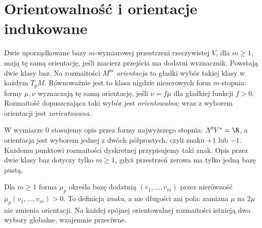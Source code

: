 \section{Orientowalność i orientacje indukowane}
\label{sec:formy-orientacja}

\begin{definicja}[Orientacja]
\label{def:orientacja-formy}
Dwie uporządkowane bazy $m$-wymiarowej przestrzeni
rzeczywistej $V$, dla $m\geq1$, mają tę samą orientację, jeśli
macierz przejścia ma dodatni wyznacznik.
Powstają dwie klasy baz. Na rozmaitości $M^m$
\emph{orientacja} to gładki wybór takiej klasy w
każdym $T_pM$. Równoważnie jest to klasa
nigdzie niezerowych form $m$-stopnia: formy
$\mu,\nu$ wyznaczają tę samą orientację, jeśli
$\nu=f\mu$ dla gładkiej funkcji $f>0$.
Rozmaitość dopuszczająca taki wybór jest
\emph{orientowalna}; wraz z wyborem orientacji
jest \emph{zorientowana}.
\end{definicja}

W wymiarze $0$ stosujemy opis przez formy najwyższego
stopnia: $\Lambda^0 V^*=\R$, a orientacja jest wyborem
jednej z dwóch półprostych, czyli znaku $+1$ lub $-1$.
Każdemu punktowi rozmaitości dyskretnej przypisujemy taki
znak. Opis przez dwie klasy baz dotyczy tylko $m\geq1$,
gdyż przestrzeń zerowa ma tylko jedną bazę pustą.

Dla $m\geq1$ forma $\mu_p$ określa bazę dodatnią $(v_1,\ldots,v_m)$
przez nierówność $\mu_p(v_1,\ldots,v_m)>0$.
To definicja \emph{znaku}, a nie długości ani pola:
zamiana $\mu$ na $2\mu$ nie zmienia orientacji.
Na każdej spójnej orientowalnej rozmaitości istnieją
dwa wybory globalne, wzajemnie przeciwne.

